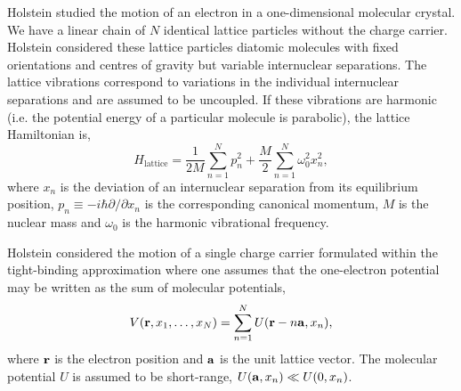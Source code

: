 Holstein studied the motion of an electron in a one-dimensional molecular crystal. We have a linear chain of $N$ identical lattice particles without the charge carrier. Holstein considered these lattice particles diatomic molecules with fixed orientations and centres of gravity but variable internuclear separations. The lattice vibrations correspond to variations in the individual internuclear separations and are assumed to be uncoupled. If these vibrations are harmonic (i.e. the potential energy of a particular molecule is parabolic), the lattice Hamiltonian is,
\begin{equation}
    H_{\text{lattice}} = \frac{1}{2M} \sum_{n=1}^N p_n^2 + \frac{M}{2} \sum_{n=1}^N \omega_0^2 x_n^2,
\end{equation}
where $x_n$ is the deviation of an internuclear separation from its equilibrium position, $p_n \equiv -i\hbar\partial/\partial x_n$ is the corresponding canonical momentum, $M$ is the nuclear mass and $\omega_0$ is the harmonic vibrational frequency.

Holstein considered the motion of a single charge carrier formulated within the tight-binding approximation where one assumes that the one-electron potential may be written as the sum of molecular potentials,
\begin{equation}
    V(\vb{r}, x_1, \dots, x_N) = \sum_{n=1}^N U(\vb{r} - n\vb{a}, x_n),
\end{equation}
where $\vb{r}$ is the electron position and $\vb{a}$ is the unit lattice vector. The molecular potential $U$ is assumed to be short-range, $U(\vb{a}, x_n) \ll U(0,x_n)$.

